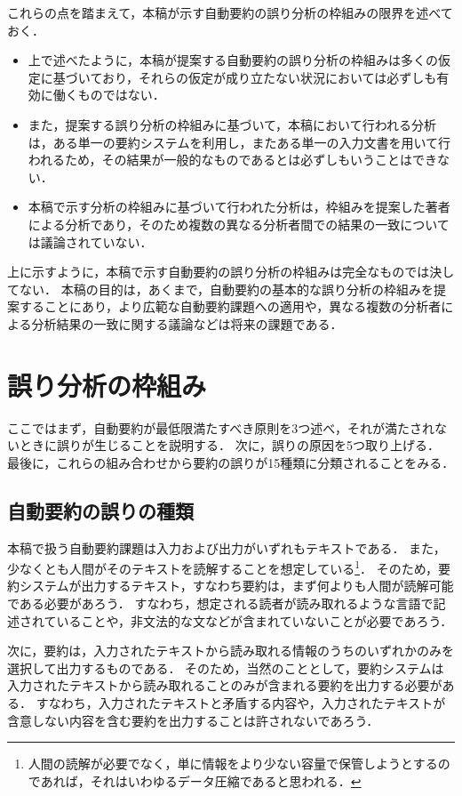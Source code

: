 これらの点を踏まえて，本稿が示す自動要約の誤り分析の枠組みの限界を述べておく．

\begin{itemize}
\item
上で述べたように，本稿が提案する自動要約の誤り分析の枠組みは多くの仮定に基づいており，それらの仮定が成り立たない状況においては必ずしも有効に働くものではない．
\item
また，提案する誤り分析の枠組みに基づいて，本稿において行われる分析は，ある単一の要約システムを利用し，またある単一の入力文書を用いて行われるため，その結果が一般的なものであるとは必ずしもいうことはできない．
\item
本稿で示す分析の枠組みに基づいて行われた分析は，枠組みを提案した著者による分析であり，そのため複数の異なる分析者間での結果の一致については議論されていない．
\end{itemize}

上に示すように，本稿で示す自動要約の誤り分析の枠組みは完全なものでは決してない．
本稿の目的は，あくまで，自動要約の基本的な誤り分析の枠組みを提案することにあり，より広範な自動要約課題への適用や，異なる複数の分析者による分析結果の一致に関する議論などは将来の課題である．


\section{誤り分析の枠組み}
\label{sc:誤り分析の枠組み}

ここではまず，自動要約が最低限満たすべき原則を3つ述べ，それが満たされないときに誤りが生じることを説明する．
次に，誤りの原因を5つ取り上げる．
最後に，これらの組み合わせから要約の誤りが15種類に分類されることをみる．


\subsection{自動要約の誤りの種類}
\label{sc:自動要約の誤りの種類}

本稿で扱う自動要約課題は入力および出力がいずれもテキストである．
また，少なくとも人間がそのテキストを読解することを想定している\footnote{
人間の読解が必要でなく，単に情報をより少ない容量で保管しようとするのであれば，それはいわゆるデータ圧縮であると思われる．}．
そのため，要約システムが出力するテキスト，すなわち要約は，まず何よりも人間が読解可能である必要があろう．
すなわち，想定される読者が読み取れるような言語で記述されていることや，非文法的な文などが含まれていないことが必要であろう．

次に，要約は，入力されたテキストから読み取れる情報のうちのいずれかのみを選択して出力するものである．
そのため，当然のこととして，要約システムは入力されたテキストから読み取れることのみが含まれる要約を出力する必要がある．
すなわち，入力されたテキストと矛盾する内容や，入力されたテキストが含意しない内容を含む要約を出力することは許されないであろう．

